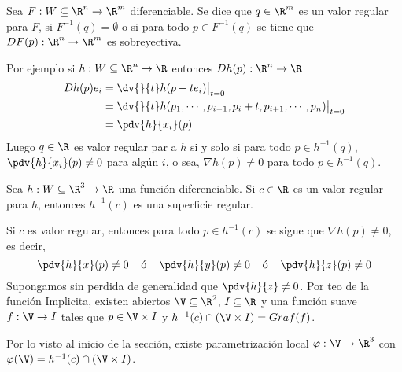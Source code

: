 \documentclass{article}
\begin{document}
\begin{dfn}
    Sea $F:W\subseteq\R^{n}\to\R^{m}$ diferenciable. Se dice que $q\in\R^{m}$ es un valor regular
    para $F$, si $F^{-1}(q)=\emptyset$ o si para todo $p\in F^{-1}(q)$ se tiene que 
    $DF(p):\R^{n}\to\R^{m}$ es sobreyectiva.
\end{dfn}

\noindent Por ejemplo si $h:W\subseteq\R^{n}\to\R$ entonces $Dh(p):\R^{n}\to\R$
\begin{align*}
    Dh(p)e_{i} &= \dv{}{t}h(p+te_{i})\big|_{t=0} \\
    &= \dv{}{t}h(p_{1},\cdots, p_{i-1},p_{i}+t,p_{i+1},\cdots,p_{n})\big|_{t=0} \\
    &= \pdv{h}{x_{i}}(p)
\end{align*}
Luego $q\in\R$ es valor regular par a $h$ si y solo si para todo $p\in h^{-1}(q)$, 
$\pdv{h}{x_{i}}(p)\neq0$ para algún $i$, o sea, $\nabla h(p)\neq0$ para todo $p\in h^{-1}(q)$.

\begin{teo}
    Sea $h:W\subseteq\R^{3}\to\R$ una función diferenciable. Si $c\in\R$ es un valor regular para
    $h$, entonces $h^{-1}(c)$ es una superficie regular.
\end{teo}
\begin{dem}
    Si $c$ es valor regular, entonces para todo $p\in h^{-1}(c)$ se sigue que $\nabla h(p)\neq0$,
    es decir,
    \begin{equation*}
        \pdv{h}{x}(p)\neq0\hspace{4mm}\text{ó}\hspace{4mm}
        \pdv{h}{y}(p)\neq0\hspace{4mm}\text{ó}\hspace{4mm}
        \pdv{h}{z}(p)\neq0
    \end{equation*}
    Supongamos sin perdida de generalidad que $\pdv{h}{z}\neq0$. Por teo de la función Implicita,
    existen abiertos $\V\subseteq\R^{2}$, $I\subseteq\R$ y una función suave $f:\V\to I$ tales que
    $p\in\V\times I$ y $h^{-1}(c)\cap(\V\times I)=Graf(f)$.
    \vspace{4mm}

    \noindent Por lo visto al inicio de la sección, existe parametrización local $\varphi:\V\to
    \R^{3}$ con $\varphi(\V)=h^{-1}(c)\cap(\V\times I)$.
\end{dem}
\end{document}
